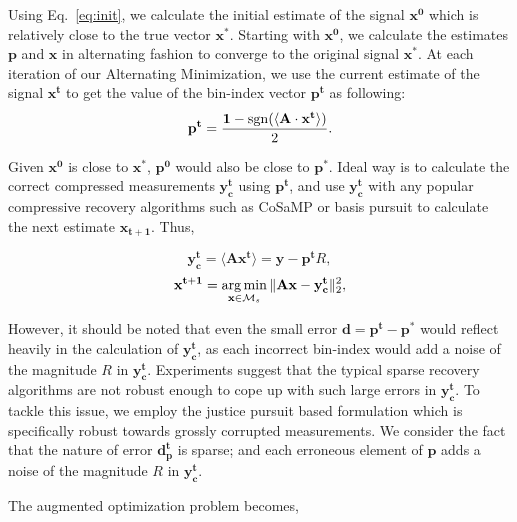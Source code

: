 Using Eq.~\ref{eq:init}, we calculate the initial estimate of the signal $\mathbf{{x}^0}$ which is relatively close to the true vector $\mathbf{x^*}$. Starting with $\mathbf{{x}^0}$, we  calculate the estimates $\mathbf{p}$ and $\mathbf{x}$ in alternating fashion to converge to the original signal $\mathbf{x^*}$. At each iteration of our Alternating Minimization, we use the current estimate of the signal ${\mathbf{x^t}}$ to get the value of the bin-index vector $\mathbf{{p}^t}$ as following:
\begin{equation}
\mathbf{{p}^{t}} = \frac{\mathbf{1}-\sgn(\langle \mathbf{A} \cdot \mathbf{x^t} \rangle)}{2}.
\label{step1}
\end{equation}


Given $\mathbf{x^0}$ is close to $\mathbf{x^*}$, $\mathbf{p^0}$ would also be close to $\mathbf{p^*}$. Ideal way is to calculate the correct compressed measurements $\mathbf{y^t_c}$ using $\mathbf{p^t}$, and use $\mathbf{y^t_c}$ with any popular compressive recovery algorithms such as CoSaMP or basis pursuit to calculate the next estimate $\mathbf{{x}_{t+1}}$. Thus,


$$
\mathbf{y^t_c} = \langle \mathbf{A}\mathbf{x^{t}} \rangle = \mathbf{y} - \mathbf{p^t}R,
$$
$$
\mathbf{{x}^{t+1}} = \argmin_{\mathbf{x} \in \mathcal{M}_s}\norm{\mathbf{Ax} - \mathbf{y^t_c}}_2^2, %
$$



However, it should be noted that even the small error $\mathbf{d} = \mathbf{p^t - p^*}$ would reflect heavily in the calculation of $\mathbf{y^t_c}$, as each incorrect bin-index would add a noise of the magnitude $R$ in $\mathbf{y^t_c}$. Experiments suggest that the typical sparse recovery algorithms are not robust enough to cope up with such large errors in $\mathbf{y^t_c}$. To tackle this issue, we employ the justice pursuit based formulation which is specifically robust towards grossly corrupted measurements. We consider the fact that the nature of error $\mathbf{d^t_p}$ is sparse; and each erroneous element of $\mathbf{p}$ adds a noise of the magnitude $R$ in $\mathbf{y^t_c}$.

The augmented optimization problem becomes,

